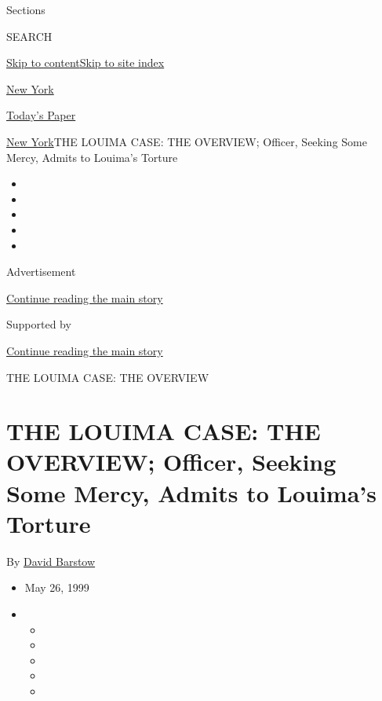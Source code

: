 Sections

SEARCH

\protect\hyperlink{site-content}{Skip to
content}\protect\hyperlink{site-index}{Skip to site index}

\href{https://www.nytimes3xbfgragh.onion/section/nyregion}{New York}

\href{https://myaccount.nytimes3xbfgragh.onion/auth/login?response_type=cookie\&client_id=vi}{}

\href{https://www.nytimes3xbfgragh.onion/section/todayspaper}{Today's
Paper}

\href{/section/nyregion}{New York}\textbar{}THE LOUIMA CASE: THE
OVERVIEW; Officer, Seeking Some Mercy, Admits to Louima's Torture

\begin{itemize}
\item
\item
\item
\item
\item
\end{itemize}

Advertisement

\protect\hyperlink{after-top}{Continue reading the main story}

Supported by

\protect\hyperlink{after-sponsor}{Continue reading the main story}

THE LOUIMA CASE: THE OVERVIEW

\hypertarget{the-louima-case-the-overview-officer-seeking-some-mercy-admits-to-louimas-torture}{%
\section{THE LOUIMA CASE: THE OVERVIEW; Officer, Seeking Some Mercy,
Admits to Louima's
Torture}\label{the-louima-case-the-overview-officer-seeking-some-mercy-admits-to-louimas-torture}}

By \href{https://www.nytimes3xbfgragh.onion/by/david-barstow}{David
Barstow}

\begin{itemize}
\item
  May 26, 1999
\item
  \begin{itemize}
  \item
  \item
  \item
  \item
  \item
  \end{itemize}
\end{itemize}


